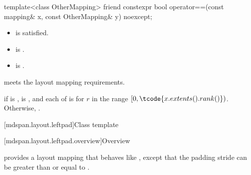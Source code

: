%
\begin{itemdecl}
template<class OtherMapping>
  friend constexpr bool operator==(const mapping& x, const OtherMapping& y) noexcept;
\end{itemdecl}

\begin{itemdescr}
\pnum
\constraints
\begin{itemize}
\item
{} is satisfied.
\item
{} is .
\item
{} is .
\end{itemize}

\pnum
\expects
{} meets the layout mapping requirements.

\pnum
\returns
{} if  is ,
 is , and
each of  is 
for $r$ in the range  $[0, \tcode{x.extents().rank()})$.
Otherwise, .
\end{itemdescr}

[mdspan.layout.leftpad]{Class template }

[mdspan.layout.leftpad.overview]{Overview}

\pnum
{} provides a layout mapping
that behaves like ,
except that the padding stride 
can be greater than or equal to .

